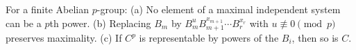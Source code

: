 For a finite Abelian $p$-group:
(a) No element of a maximal independent system can be a $p$th power.
(b) Replacing $B_m$ by $B_m^u B_{m+1}^{x_{m+1}}\cdots B_r^{x_r}$ with $u \not\equiv 0 \pmod{p}$ preserves maximality.
(c) If $C^p$ is representable by powers of the $B_i$, then so is $C$.
